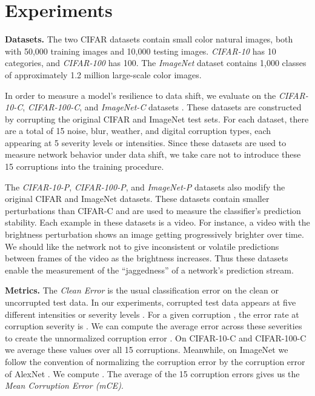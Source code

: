 \documentclass{article} \usepackage{iclr2020_conference,times}
\begin{document}
\section{Experiments}

\noindent\textbf{Datasets.} The two CIFAR \citep{cifar_datasets} datasets contain small  color natural images, both with 50,000 training images and 10,000 testing images. \emph{CIFAR-10} has 10 categories, and \emph{CIFAR-100} has 100. The \emph{ImageNet} \citep{imagenet} dataset contains 1,000 classes of approximately 1.2 million large-scale color images. 

In order to measure a model's resilience to data shift, we evaluate on the
\emph{CIFAR-10-C}, \emph{CIFAR-100-C}, and \emph{ImageNet-C} datasets \citep{hendrycks2019robustness}. These datasets are constructed by corrupting the original CIFAR and ImageNet test sets. For each dataset, there are a total of 15 noise, blur, weather, and digital corruption types, each appearing at 5 severity levels or intensities. Since these datasets are used to measure network behavior under data shift, we take care not to introduce these 15 corruptions into the training procedure.

The \emph{CIFAR-10-P}, \emph{CIFAR-100-P}, and \emph{ImageNet-P} datasets also modify the original CIFAR and ImageNet datasets. These datasets contain smaller perturbations than CIFAR-C and are used to measure the classifier's prediction stability. Each example in these datasets is a video. For instance, a video with the brightness perturbation shows an image getting progressively brighter over time. We should like the network not to give inconsistent or volatile predictions between frames of the video as the brightness increases. Thus these datasets enable the measurement of the ``jaggedness'' \citep{transforms} of a network's prediction stream.

\noindent\textbf{Metrics.} The \emph{Clean Error} is the usual classification error on the clean or uncorrupted test data.
In our experiments, corrupted test data appears at five different intensities or severity levels . For a given corruption , the error rate at corruption severity  is . We can compute the average error across these severities to create the unnormalized corruption error .
On CIFAR-10-C and CIFAR-100-C we average these values over all 15 corruptions. Meanwhile, on ImageNet we follow the convention of normalizing the corruption error by the corruption error of AlexNet \citep{AlexNet}. We compute . The average of the 15 corruption errors  gives us the \emph{Mean Corruption Error (mCE)}.
\end{document}
